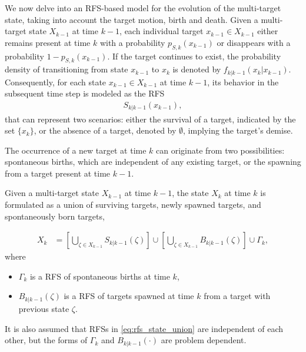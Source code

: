 We now delve into an RFS-based model for the evolution of the multi-target state, taking into account the target motion,
birth and death. Given a multi-target state $X_{k-1}$ at time $k-1$, each individual target $x_{k-1} \in X_{k-1}$
either remains present at time $k$ with a probability $p_{S,k}(x_{k-1})$ or disappears with a probability $1 - p_{S,k}(x_{k-1})$. If the target continues to exist, the probability density of transitioning from state $x_{k-1}$ to $x_k$ is denoted by $f_{k|k-1}(x_k|x_{k-1})$. Consequently, for each state $x_{k-1} \in X_{k-1}$ at time $k-1$, its behavior in the subsequent time step is modeled as the RFS
\begin{align}
    S_{k|k-1}(x_{k-1}),
\end{align}
that can represent two scenarios: either the survival of a target, indicated by the set $\{x_k\}$, or the absence of a
target, denoted by $\emptyset$, implying the target's demise.

The occurrence of a new target at time $k$ can originate from two possibilities: spontaneous births, which are independent of any existing target, or the spawning from a target present at time $k-1$.

Given a multi-target state $X_{k-1}$ at time $k-1$, the state $X_k$ at time $k$ is formulated as a union of
surviving targets, newly spawned targets, and spontaneously born targets,

\begin{align}
    X_k &= \left[\bigcup_{\zeta \in X_{k-1}}S_{k|k-1}(\zeta) \right] \cup \left[ \bigcup_{\zeta \in X_{k-1}} B_{k|k-1}(\zeta) \right] \cup \Gamma_k, \label{eq:rfs_state_union}
\end{align}
where
\begin{itemize}
    \item $\Gamma_k$ is a RFS of spontaneous births at time $k$,
    \item $B_{k|k-1}(\zeta)$ is a RFS of targets spawned at time $k$ from a target with previous state $\zeta$.
\end{itemize}
It is also assumed that RFSs in \eqref{eq:rfs_state_union} are independent of each other, but the forms of $\Gamma_k$
and $B_{k|k-1}(\cdot)$ are problem dependent.

